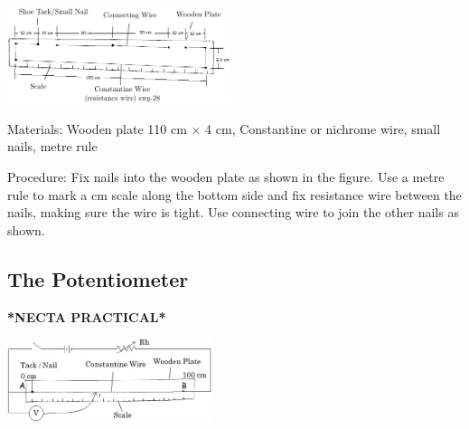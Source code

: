 \begin{multicols}{2}
\begin{center}
\includegraphics[width=0.49\textwidth]{./img/metre-bridge-2.png}
\end{center}

\begin{description*}
\item[Materials:]{Wooden plate 110 cm $\times$ 4 cm, Constantine or nichrome wire, small nails, metre rule}
\item[Procedure:]{Fix nails into the wooden plate as shown in the figure. Use a metre rule to mark a cm scale along the bottom side and fix resistance wire between the nails, making sure the wire is tight. Use connecting wire to join the other nails as shown.}
\end{description*}

\subsection{The Potentiometer} 
\textbf{*NECTA PRACTICAL*}

\begin{center}
\includegraphics[width=0.45\textwidth]{./img/potentiometer.jpg}
\end{center}


\end{multicols}
